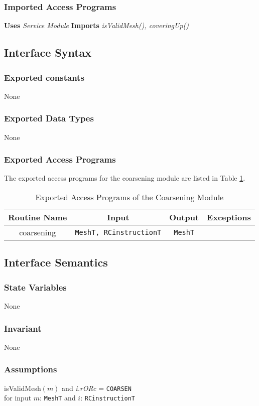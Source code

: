 \documentclass[12pt,titlepage]{article}
\begin{document}
\subsubsection{Imported Access Programs}
{\bf Uses}  \emph{Service Module}  {\bf Imports}  \emph{isValidMesh(), coveringUp()}  

\subsection{Interface Syntax}
\subsubsection{Exported constants} None
\subsubsection{Exported Data Types} None
\subsubsection{Exported Access Programs}
The exported access programs for the coarsening module are listed in Table \ref{AmisCoaEAP}.
\begin{table}[htbp]
\centering
\begin{tabular}{|c|c|c|c|}
\hline
Routine Name & Input & Output & Exceptions \\ 
\hline
coarsening & {\tt MeshT, RCinstructionT} &{\tt MeshT} & \\
\hline
\end{tabular}
\caption{Exported Access Programs of the Coarsening Module}
\label{AmisCoaEAP} 
\end{table}

\subsection{Interface Semantics}
\subsubsection{State Variables}None
\subsubsection{Invariant} None
\subsubsection{Assumptions} isValidMesh$(m)$ and {\it i.rORc} = {\tt COARSEN} \\for input $m$: {\tt MeshT} and $i$: {\tt RCinstructionT}
\end{document}
